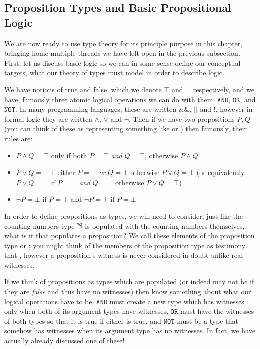 \documentclass[11pt]{article}
\begin{document}
\subsection{Proposition Types and Basic Propositional Logic}

We are now ready to use type theory for its principle purpose in this chapter, bringing home multiple threads we have left open in the previous subsection. First, let us discuss basic logic so we can in some sense define our conceptual targets, what our theory of types must model in order to describe logic.

We have notions of true and false, which we denote $\top$ and $\bot$ respectively, and we have, famously three atomic logical operations we can do with them: $\mathtt{AND}$, $\mathtt{OR}$, and $\mathtt{NOT}$. In many programming languages, these are written $\mathtt{\&\&}$, $\mathtt{||}$ and $\mathtt{!}$, however in formal logic they are written $\wedge$, $\vee$ and $\neg$. Then if we have two propositions $P,Q$ (you can think of these as representing something like  or ) then famously, their rules are: \begin{itemize}
\item $P \wedge Q = \top$ only if both $P= \top$ \emph{and} $Q = \top$, otherwise $P \wedge Q = \bot$.
\item $P \vee Q = \top$ if either $P = \top$ \emph{or} $Q = \top$ otherwise $P \vee Q = \bot$ (or equivalently $P \vee Q = \bot$ if $P = \bot$ \emph{and} $Q = \bot$ otherwise $P \vee Q = \top$)
\item $\neg P = \bot$ if $P = \top $ and $\neg P = \top$ if $P = \bot$
\end{itemize}

In order to define propositions as types, we will need to consider, just like the counting numbers type $\mathbb{N}$ is populated with the counting numbers themselves, what is it that populates a proposition? We call these elements of the proposition type  or ; you might think of the members of the proposition type  as testimony that , however a proposition's witness is never considered in doubt unlike real witnesses. 

If we think of propositions as types which are populated (or indeed may not be if they are \emph{false} and thus have no witnesses) then know something about what our logical operations have to be. $\mathtt{AND}$ must create a new type which has witnesses only when both of its argument types have witnesses, $\mathtt{OR}$ must have the witnesses of both types so that it is true if either is true, and $\mathtt{NOT}$ must be a type that somehow has witnesses when its argument type has no witnesses. In fact, we have actually already discussed one of these!
\end{document}
